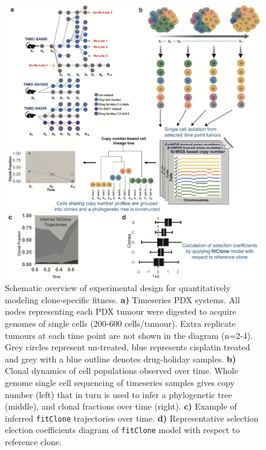 \begin{figure}
\centering
\includegraphics[width=\textwidth]{Figures/chap4/fig1thesischap4.png}
\caption[Schematic overview of experimental design for quantitatively modeling clone-specific fitness]{Schematic overview of experimental design for quantitatively modeling clone-specific fitness. \textbf{a)} Timeseries PDX systems. All nodes representing each PDX tumour were digested to acquire genomes of single cells (200-600 cells/tumour). Extra replicate tumours at each time point are not shown in the diagram (n=2-4). Grey circles represent un-treated, blue represents cisplatin treated and grey with a blue outline denotes drug-holiday samples. \textbf{b)} Clonal dynamics of cell populations observed over time. Whole genome single cell sequencing of timeseries samples gives copy number (left) that in turn is used to infer a phylogenetic tree (middle), and clonal fractions over time (right). \textbf{c)} Example of inferred \texttt{fitClone} trajectories over time. \textbf{d)} Representative selection election coefficients diagram of \texttt{fitClone} model with respect to reference clone.}
\label{fig:schematic}
\end{figure}



